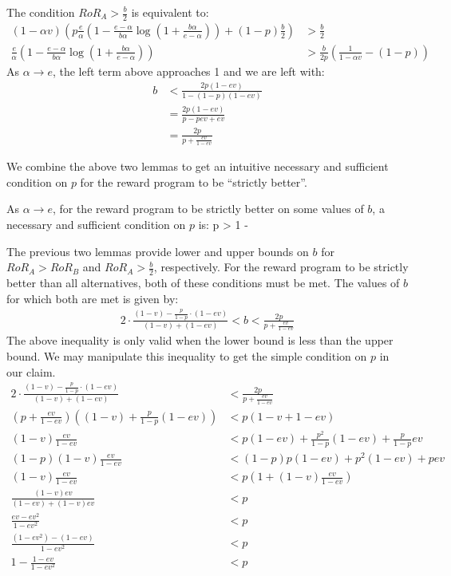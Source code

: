 \proof
The condition $RoR_A > \frac{b}{2}$ is equivalent to:
\begin{align*}
(1-\alpha v)\left(p \frac{e}{\alpha}\left(1-\frac{e-\alpha}{b\alpha}\log \left(1+\frac{b\alpha}{e-\alpha} \right) \right)+(1-p)\frac{b}{2}\right) &> \frac{b}{2} \\
\frac{e}{\alpha} \left(1-\frac{e-\alpha}{b\alpha}\log \left(1+\frac{b\alpha}{e-\alpha} \right) \right) &> \frac{b}{2p}\left(\frac{1}{1-\alpha v}-(1-p) \right)
\end{align*}
As $\alpha \rightarrow e$, the left term above approaches 1 and we are left with:
\begin{align*}
b &< \frac{2 p (1-ev)}{1-(1-p)(1-ev)} \\
&= \frac{2p(1-ev)}{p-pev+ev} \\
&= \frac{2p}{p+\frac{ev}{1-ev}}
\end{align*}
\endproof

We combine the above two lemmas to get an intuitive necessary and sufficient condition on $p$ for the reward program to be ``strictly better''. 

\begin{lemma}
As $\alpha \rightarrow e$, for the reward program to be strictly better on some values of $b$, a necessary and sufficient condition on $p$ is:
\beq
\label{eq:necp}
p > 1 - 
\eeq
\end{lemma}

\proof
The previous two lemmas provide lower and upper bounds on $b$ for $RoR_A > RoR_B$ and $RoR_A > \frac{b}{2}$, respectively. For the reward program to be strictly better than all alternatives, both of these conditions must be met. The values of $b$ for which both are met is given by:
\begin{align*}
2\cdot \frac{(1-v) - \frac{p}{1-p}\cdot (1-ev)}{(1-v) + (1-ev)} < b < \frac{2p}{p+\frac{ev}{1-ev}}
\end{align*}
The above inequality is only valid when the lower bound is less than the upper bound. We may manipulate this inequality to get the simple condition on $p$ in our claim.
\begin{align*}
2\cdot \frac{(1-v) - \frac{p}{1-p}\cdot (1-ev)}{(1-v) + (1-ev)} &< \frac{2p}{p+\frac{ev}{1-ev}} \\
\left(p+\frac{ev}{1-ev} \right)\left((1-v)+\frac{p}{1-p}(1-ev) \right) &<  p(1-v+1-ev) \\
(1-v)\frac{ev}{1-ev} &< p(1-ev)+\frac{p^2}{1-p}(1-ev) + \frac{p}{1-p}ev \\
(1-p)(1-v)\frac{ev}{1-ev} &< (1-p)p(1-ev)+p^2(1-ev)+pev \\
(1-v)\frac{ev}{1-ev} &< p\left(1+(1-v)\frac{ev}{1-ev} \right) \\
\frac{(1-v)ev}{(1-ev)+(1-v)ev} &< p \\
\frac{ev-ev^2}{1-ev^2} &< p \\
\frac{(1-ev^2)-(1-ev)}{1-ev^2} &< p \\
1-\frac{1-ev}{1-ev^2} &< p
\end{align*}
\endproof

